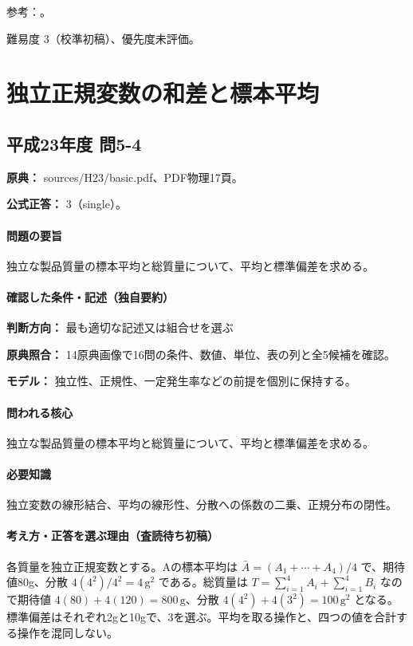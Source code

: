 \par 参考：\cite{env60_ramsar}。

\par 難易度 3（校準初稿）、優先度未評価。

\section{独立正規変数の和差と標本平均}

\subsection{平成23年度 問5-4}
\label{q:h23-reg-basic-5-4}

\noindent\textbf{原典：} sources/H23/basic.pdf、PDF物理17頁。

\textbf{公式正答：} 3（single）。

\paragraph{問題の要旨} 独立な製品質量の標本平均と総質量について、平均と標準偏差を求める。

\paragraph{確認した条件・記述（独自要約）}\mbox{}\par

\noindent\textbf{判断方向：} 最も適切な記述又は組合せを選ぶ\par

\noindent\textbf{原典照合：} 14原典画像で16問の条件、数値、単位、表の列と全5候補を確認。\par

\noindent\textbf{モデル：} 独立性、正規性、一定発生率などの前提を個別に保持する。\par

\paragraph{問われる核心} 独立な製品質量の標本平均と総質量について、平均と標準偏差を求める。

\paragraph{必要知識} 独立変数の線形結合、平均の線形性、分散への係数の二乗、正規分布の閉性。

\paragraph{考え方・正答を選ぶ理由（査読待ち初稿）} 各質量を独立正規変数とする。Aの標本平均は \(\bar A=(A_1+\cdots+A_4)/4\) で、期待値80g、分散 \(4(4^2)/4^2=4\,\mathrm{g^2}\) である。総質量は \(T=\sum_{i=1}^4A_i+\sum_{i=1}^4B_i\) なので期待値 \(4(80)+4(120)=800\,\mathrm g\)、分散 \(4(4^2)+4(3^2)=100\,\mathrm{g^2}\) となる。標準偏差はそれぞれ2gと10gで、3を選ぶ。平均を取る操作と、四つの値を合計する操作を混同しない。

